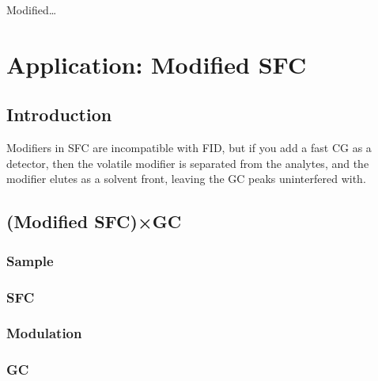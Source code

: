 
\begin{savequote}[45mm]
Modified\ldots
{}
\end{savequote}

\chapter{Application: Modified SFC} %

\label{Chapter7} %


\section{Introduction}

Modifiers in SFC are incompatible with FID, but if you add a fast CG as a
detector, then the volatile modifier is separated from the analytes, and the
modifier elutes as a solvent front, leaving the GC peaks uninterfered with.


\section{(Modified SFC)×GC}

\subsection{Sample}

\subsection{SFC}

\subsection{Modulation}

\subsection{GC}

